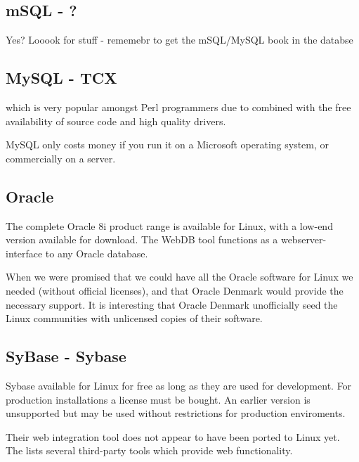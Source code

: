 \subsection{mSQL - ?}
\label{sec:msql}

\textsf{Yes?  Looook for stuff - rememebr to get the mSQL/MySQL book
  in the databse}

\subsection{MySQL - TCX}
\label{sec:mysql}

 which is
very popular amongst Perl programmers due to
combined with the free availability of source code and high quality
drivers.

MySQL only costs money if you run it on a Microsoft operating system,
or commercially on a server.

\subsection{Oracle}
\label{sec:oracle}

The complete Oracle 8i product range is available for Linux, with a
low-end version available for download.  The WebDB tool functions as a
webserver-interface to any Oracle database.

When
 we were promised that we
could have all the Oracle software for Linux we needed (without
official licenses), and that Oracle Denmark would provide the
necessary support.  It is interesting that Oracle Denmark unofficially
seed the Linux communities with unlicensed copies of their software.

\subsection{SyBase - Sybase}

Sybase  available for
  Linux for free as long as they are used for development.  For
  production installations a license must be bought.  An earlier
  version is unsupported but may be used without restrictions for
  production enviroments.
  
  Their web integration tool does not appear to have been ported to
  Linux yet.  The  lists several third-party tools which provide web
  functionality.

